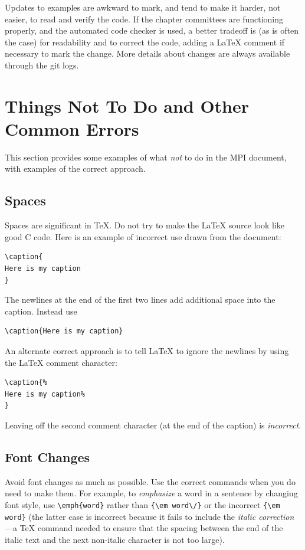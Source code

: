 \documentclass[letterpaper,twoside,11pt,fleqn]{article}
\def\MPI/{\textsf{MPI}}    %
\begin{document}
Updates to examples are awkward to mark, and tend to make it harder,
not easier, to read and verify the code.  If the chapter committees
are functioning properly, and the automated code checker is used, a
better tradeoff is (as is often the case) for readability and to
correct the code, adding a LaTeX comment if necessary to mark the
change.  More details about changes are always available through the
git logs.

\section{Things Not To Do and Other Common Errors}
\label{sec:not-to-do}
This section provides some examples of what \emph{not} to do in the
\MPI/ document, with examples of the correct approach.

\subsection{Spaces}

Spaces are significant in TeX.
Do not try to make the LaTeX source
look like good C code.  Here is an example of incorrect use drawn from
the document:
\begin{verbatim}
\caption{
Here is my caption
}
\end{verbatim}
The newlines at the end of the first two lines add additional space
into the caption. Instead use
\begin{verbatim}
\caption{Here is my caption}
\end{verbatim}
An alternate correct approach is to tell LaTeX to ignore the newlines
by using the LaTeX comment character:
\begin{verbatim}
\caption{%
Here is my caption%
}
\end{verbatim}
Leaving off the second comment character (at the end of the caption)
is \emph{incorrect}.

\subsection{Font Changes}
Avoid font changes as much as possible.  Use the correct commands when
you do need to make them.  For example, to \emph{emphasize} a word in
a sentence by changing font style, use \verb+\emph{word}+ rather than
\verb+{\em word\/}+ or the incorrect \verb+{\em word}+ (the latter
case is incorrect because it fails to include the \emph{italic
  correction}---a TeX command needed to ensure that the spacing
between the end of the italic text and the next non-italic character
is not too large).
\end{document}
